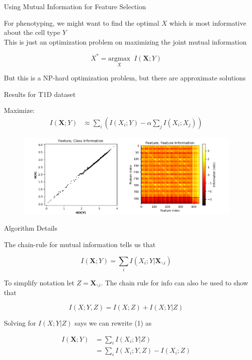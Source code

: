 \documentclass{beamer}					%
\begin{document}
\begin{frame}{Using Mutual Information for Feature Selection}

For phenotyping, we might want to find the optimal $X$ which is most informative about the cell type $Y$\\
\vspace{0.2in}
This is just an optimization problem on maximizing the joint mutual information

\begin{equation*}
X^{*} = \underset{X}{\mathrm{argmax}}\;\; I(\bm{X};Y)
\end{equation*}

But this is a NP-hard optimization problem, but there are approximate solutions

\end{frame}

\begin{frame}{Results for T1D dataset}

Maximize:
\begin{align*}
I(\bm{X};Y) &\approx \sum_{i} \left(I(X_{i};Y)- \alpha\sum_{j}I(X_{i};X_{j}) \right)
\end{align*}

\begin{center}
\begin{figure}
\includegraphics[width=1.0\textwidth]{info.png}
\end{figure}
\end{center}
\end{frame}

\begin{frame}{Algorithm Details}

The chain-rule for mutual information tells us that

\begin{equation}
I(\bm{X};Y) = \sum_{i}I(X_{i};Y|\bm{X}_{\backslash i})
\end{equation} 

To simplify notation let $Z = \bm{X}_{\backslash i}$. The chain rule for info can also be used to show that 

\begin{equation*}
I(X;Y,Z) = I(X;Z) + I(X;Y|Z)
\end{equation*}

Solving for $I(X;Y|Z)$ says we can rewrite (1) as

\begin{align*}
I(\bm{X};Y) &= \sum_{i}I(X_{i};Y|Z)\\
&= \sum_{i}I(X_{i};Y,Z) - I(X_{i};Z)
\end{align*} 

\end{frame}
\end{document}
